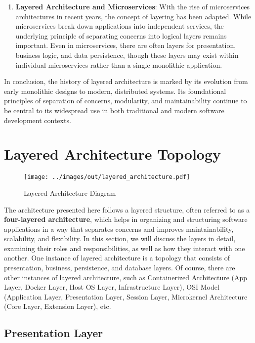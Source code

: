 \begin{enumerate}
	\item \textbf{Layered Architecture and Microservices}: 
	With the rise of microservices architectures in recent years, the concept of layering has been adapted. While microservices break down applications into independent services, the underlying principle of separating concerns into logical layers remains important. Even in microservices, there are often layers for presentation, business logic, and data persistence, though these layers may exist within individual microservices rather than a single monolithic application.
\end{enumerate}

In conclusion, the history of layered architecture is marked by its evolution from early monolithic designs to modern, distributed systems. Its foundational principles of separation of concerns, modularity, and maintainability continue to be central to its widespread use in both traditional and modern software development contexts.


\section{Layered Architecture Topology}

\begin{figure}[ht]
	\centering
	\texttt{[image: ../images/out/layered\_architecture.pdf]}
	\caption{Layered Architecture Diagram}
	\label{fig:layered_architecture}
\end{figure}

The architecture presented here follows a layered structure, often referred to as a \textbf{four-layered architecture}, which helps in organizing and structuring software applications in a way that separates concerns and improves maintainability, scalability, and flexibility. In this section, we will discuss the layers in detail, examining their roles and responsibilities, as well as how they interact with one another. One instance of layered architecture is a topology that consists of presentation, business, persistence, and database layers. Of course, there are other instances of layered architecture, such as Containerized Architecture (App Layer, Docker Layer, Host OS Layer, Infrastructure Layer), OSI Model (Application Layer, Presentation Layer, Session Layer, Microkernel Architecture (Core Layer, Extension Layer), etc.

\subsection{Presentation Layer}

